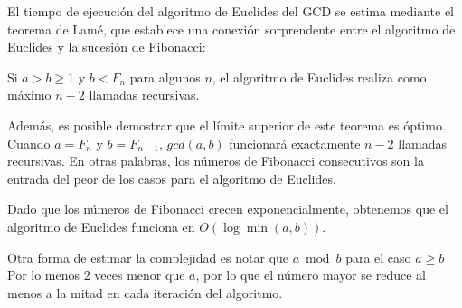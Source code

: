 El tiempo de ejecución del algoritmo de Euclides del GCD se estima mediante el teorema de Lamé, que establece una conexión sorprendente entre el algoritmo de Euclides y la sucesión de Fibonacci:

Si $a > b \geq 1$ y $b < F_n$ para algunos $n$, el algoritmo de Euclides realiza como máximo $n-2$ llamadas recursivas.

Además, es posible demostrar que el límite superior de este teorema es óptimo. Cuando $a = F_n$ y $b = F_{n-1}$, $gcd(a, b)$ funcionará exactamente $n-2$ llamadas recursivas. En otras palabras, los números de Fibonacci consecutivos son la entrada del peor de los casos para el algoritmo de Euclides.

Dado que los números de Fibonacci crecen exponencialmente, obtenemos que el algoritmo de Euclides funciona en $O(\log \min(a, b))$.

Otra forma de estimar la complejidad es notar que $a \bmod b$ para el caso $a \geq b$ Por lo menos $2$ veces menor que $a$, por lo que el número mayor se reduce al menos a la mitad en cada iteración del algoritmo.